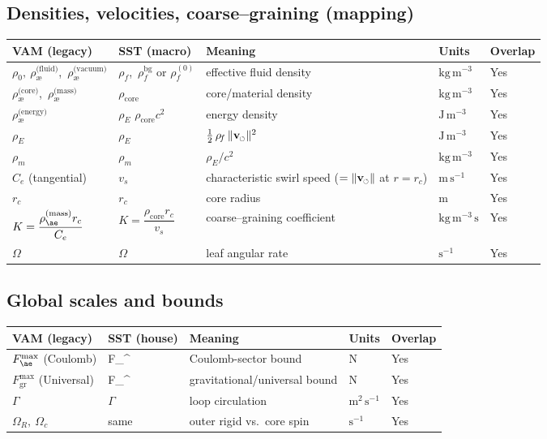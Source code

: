 \documentclass[11pt]{article}
\newcommand{\swirlarrow}{%
	\mathchoice{\mkern-2mu\scriptstyle\boldsymbol{\circlearrowleft}}%
	{\mkern-2mu\scriptstyle\boldsymbol{\circlearrowleft}}%
	{\mkern-2mu\scriptscriptstyle\boldsymbol{\circlearrowleft}}%
	{\mkern-2mu\scriptscriptstyle\boldsymbol{\circlearrowleft}}%
}
\newcommand{\vswirl}{\mathbf{v}_{\swirlarrow}}
\newcommand{\vscore}{v_s}                                %
\newcommand{\vnorm}{\lVert \vswirl \rVert}               %
\newcommand{\rhoF}{\rho_{\!f}}                           %
\newcommand{\rhoE}{\rho_{\!E}}                           %
\newcommand{\rhoM}{\rho_{\!m}}                           %
\newcommand{\rhoC}{\rho_{\mathrm{core}}} %
\newcommand{\FmaxEM}{F_{\mathrm{EM}}^{\max}}             %
\newcommand{\FmaxG}{F_{\mathrm{G}}^{\max}}               %
\begin{document}
	\subsection*{Densities, velocities, coarse–graining (mapping)}
		\begin{center}
			\begin{tabular}{lllll}
				\hline
				\textbf{VAM (legacy)} & \textbf{SST (macro)} & \textbf{Meaning} & \textbf{Units} & \textbf{Overlap} \\
				\hline
				$\rho_0,\ \rho_{\text{\ae}}^{\text{(fluid)}}$,\ $\rho_{\text{\ae}}^{\text{(vacuum)}}$ & $\rhoF$,\ $\rhoF^{\mathrm{bg}}$ or $\rhoF^{(0)}$ & effective fluid density & $\mathrm{kg\,m^{-3}}$ & Yes \\
				$\rho_{\text{\ae}}^{\text{(core)}}$,\ 	$\rho_{\text{\ae}}^{\text{(mass)}}$  & $\rhoC$ & core/material density & $\mathrm{kg\,m^{-3}}$ & Yes \\
				$\rho_{\text{\ae}}^{\text{(energy)}}$ & $\rhoE$ \text{ (or } $\rhoC c^2$\text{)} & energy density & $\mathrm{J\,m^{-3}}$ & Yes \\
				$\rho_E$ & $\rhoE$ & $\tfrac12\,\rhoF\,\vnorm^2$ & $\mathrm{J\,m^{-3}}$ & Yes \\
				$\rho_m$ & $\rhoM$ & $\rhoE/c^2$ & $\mathrm{kg\,m^{-3}}$ & Yes \\
				$C_e$ (tangential) & $\vscore$ & characteristic swirl speed ($=\|\vswirl\|$ at $r=r_c$) & $\mathrm{m\,s^{-1}}$ & Yes \\
				$r_c$ & $r_c$ & core radius & $\mathrm{m}$ & Yes \\
				$K=\dfrac{\rho_{\ae}^{(\text{mass})} r_c}{C_e}$ & $K=\dfrac{\rhoC r_c}{\vscore}$ & coarse–graining coefficient & $\mathrm{kg\,m^{-3}\,s}$ & Yes \\
				$\Omega$ & $\Omega$ & leaf angular rate & $\mathrm{s^{-1}}$ & Yes \\
				\hline
			\end{tabular}
		\end{center}

	\subsection*{Global scales and bounds}
		\begin{center}
			\begin{tabular}{lllll}
				\hline
				\textbf{VAM (legacy)} & \textbf{SST (house)} & \textbf{Meaning} & \textbf{Units} & \textbf{Overlap} \\
				\hline
				$F_{\ae}^{\max}$ (Coulomb) & \FmaxEM & Coulomb-sector bound & $\mathrm{N}$ & Yes \\
				$F_{\mathrm{gr}}^{\max}$ (Universal) & \FmaxG & gravitational/universal bound & $\mathrm{N}$ & Yes \\
				$\Gamma$ & $\Gamma$ & loop circulation & $\mathrm{m^{2}\,s^{-1}}$ & Yes \\
				$\Omega_R,\ \Omega_c$ & same & outer rigid vs.\ core spin & $\mathrm{s^{-1}}$ & Yes \\
				\hline
			\end{tabular}
		\end{center}
\end{document}
